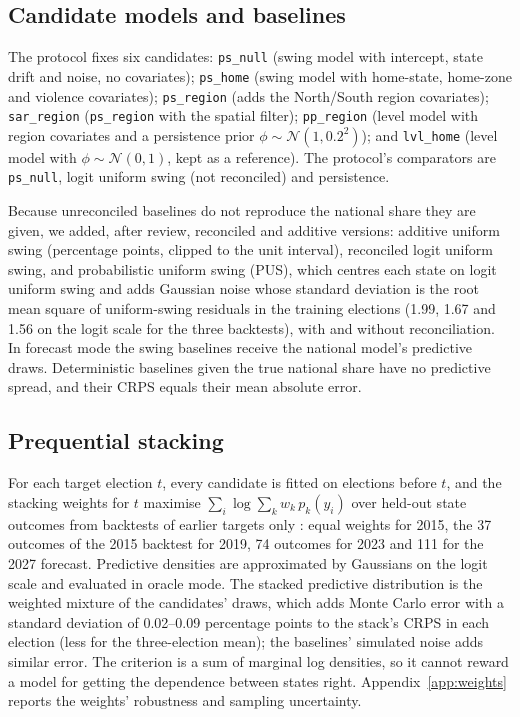 \documentclass[preprint,12pt,authoryear]{elsarticle}
\begin{document}
\subsection{Candidate models and baselines}
The protocol fixes six candidates: \texttt{ps\_null} (swing model with intercept, state drift and noise, no covariates); \texttt{ps\_home} (swing model with home-state, home-zone and violence covariates); \texttt{ps\_region} (adds the North/South region covariates); \texttt{sar\_region} (\texttt{ps\_region} with the spatial filter); \texttt{pp\_region} (level model with region covariates and a persistence prior $\phi \sim \mathcal{N}(1, 0.2^2)$); and \texttt{lvl\_home} (level model with $\phi \sim \mathcal{N}(0,1)$, kept as a reference). The protocol's comparators are \texttt{ps\_null}, logit uniform swing (not reconciled) and persistence.

Because unreconciled baselines do not reproduce the national share they are given, we added, after review, reconciled and additive versions: additive uniform swing (percentage points, clipped to the unit interval), reconciled logit uniform swing, and probabilistic uniform swing (PUS), which centres each state on logit uniform swing and adds Gaussian noise whose standard deviation is the root mean square of uniform-swing residuals in the training elections (1.99, 1.67 and 1.56 on the logit scale for the three backtests), with and without reconciliation. In forecast mode the swing baselines receive the national model's predictive draws. Deterministic baselines given the true national share have no predictive spread, and their CRPS equals their mean absolute error.

\subsection{Prequential stacking}
For each target election $t$, every candidate is fitted on elections before $t$, and the stacking weights for $t$ maximise $\sum_i \log \sum_k w_k\, p_k(y_i)$ over held-out state outcomes from backtests of earlier targets only \citep{Yao2018UsingStacking}: equal weights for 2015, the 37 outcomes of the 2015 backtest for 2019, 74 outcomes for 2023 and 111 for the 2027 forecast. Predictive densities are approximated by Gaussians on the logit scale and evaluated in oracle mode. The stacked predictive distribution is the weighted mixture of the candidates' draws, which adds Monte Carlo error with a standard deviation of 0.02--0.09 percentage points to the stack's CRPS in each election (less for the three-election mean); the baselines' simulated noise adds similar error. The criterion is a sum of marginal log densities, so it cannot reward a model for getting the dependence between states right. Appendix~\ref{app:weights} reports the weights' robustness and sampling uncertainty.
\end{document}
